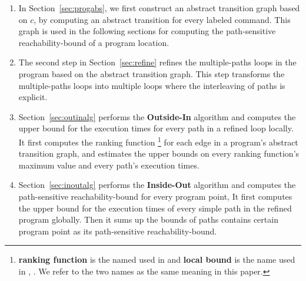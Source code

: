 \begin{enumerate}
\item  In Section~\ref{sec:progabs}, we first construct an abstract transition graph based on $c$, by computing an abstract transition 
for every labeled command. 
This graph is used in the following sections
for computing the path-sensitive reachability-bound of a program location.
\item The second step in Section~\ref{sec:refine}
refines the multiple-paths loops in the program
based on the abstract transition graph.
This step transforms the multiple-paths loops into multiple loops where
the interleaving of paths is explicit.
\item Section~\ref{sec:outinalg} performs the \textbf{Outside-In} algorithm and computes
the upper bound for the execution times for every path in a refined loop locally.
It first computes the ranking function  
\footnote{\textbf{ranking function} is the named used in \cite{SinnZV14}
and \textbf{local bound} is the name used in \cite{ZulegerGSV11}, \cite{sinn2017complexity}.
We refer to the two names as the same meaning in this paper.} 
for each edge in a program's abstract transition graph,
and estimates the upper bounds on every ranking function's maximum value and every path's execution times.
\item Section~\ref{sec:inoutalg}
performs the \textbf{Inside-Out} algorithm and 
computes the path-sensitive reachability-bound for every program point,
It first computes the upper bound for the execution times of
every simple path in the refined program globally. 
Then it sums up the bounds of paths contains certain program point as its path-sensitive reachability-bound.
\end{enumerate}